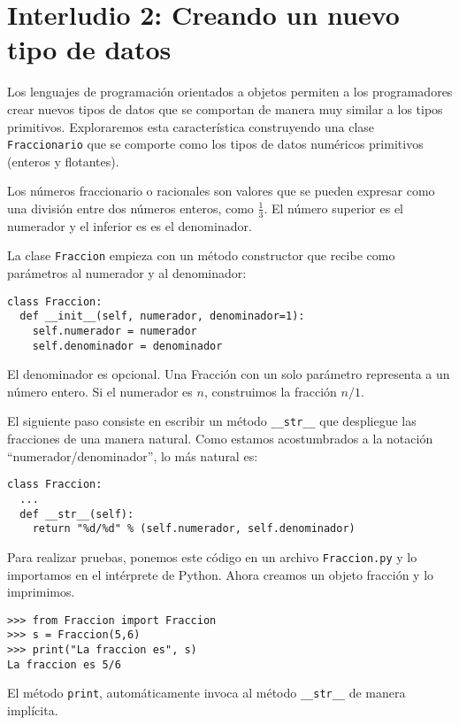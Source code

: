 
\chapter{Interludio 2: Creando un nuevo tipo de datos }

\label{overloading} 

Los lenguajes de programación orientados a objetos permiten a los
programadores crear nuevos tipos de datos que se comportan de manera
muy similar a los tipos primitivos. Exploraremos esta característica
construyendo una clase \texttt{Fraccionario} que se comporte como
los tipos de datos numéricos primitivos (enteros y flotantes).

Los números fraccionario o racionales son valores que se pueden expresar
como una división entre dos números enteros, como $\frac{1}{3}$.
El número superior es el numerador y el inferior es es el denominador.

   

La clase \texttt{Fraccion} empieza con un método constructor que recibe
como parámetros al numerador y al denominador:

\begin{lstlisting}
class Fraccion:
  def __init__(self, numerador, denominador=1):
    self.numerador = numerador
    self.denominador = denominador
\end{lstlisting}
El denominador es opcional. Una Fracción con un solo parámetro representa
a un número entero. Si el numerador es $n$, construimos la fracción
$n/1$.

El siguiente paso consiste en escribir un método \texttt{\_\_str\_\_}
que despliegue las fracciones de una manera natural. Como estamos
acostumbrados a la notación ``numerador/denominador'', lo más natural
es:

\begin{lstlisting}
class Fraccion:
  ...
  def __str__(self):
    return "%d/%d" % (self.numerador, self.denominador)
\end{lstlisting}
 Para realizar pruebas, ponemos este código en un archivo \texttt{Fraccion.py}
y lo importamos en el intérprete de Python. Ahora creamos un objeto
fracción y lo imprimimos.

\begin{lstlisting}
>>> from Fraccion import Fraccion
>>> s = Fraccion(5,6)
>>> print("La fraccion es", s)
La fraccion es 5/6
\end{lstlisting}
 El método \texttt{print}, automáticamente invoca al método \texttt{\_\_str\_\_}
de manera implícita.

